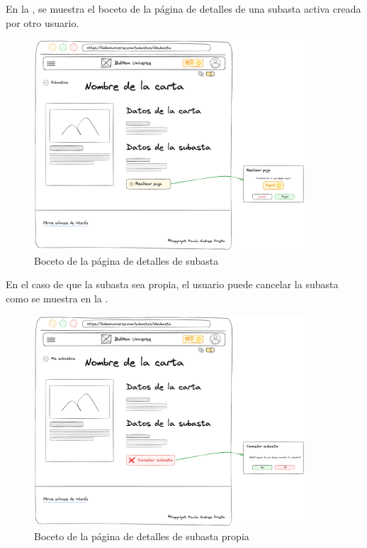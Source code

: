 En la ,
se muestra el boceto de la página de detalles de una subasta activa creada por otro usuario.
\begin{figure}[H]
    \centering
    \includegraphics[width=0.9\textwidth]{figures/6-Analisis/6-Interfaz/prototipos/detalle-subasta.png}
    \caption{Boceto de la página de detalles de subasta}
    \label{fig:p_auction_details}
    \hypertarget{fig:p_auction_details}{}
\end{figure}

En el caso de que la subasta sea propia, el usuario puede cancelar la subasta como se muestra en la .
\begin{figure}[H]
    \centering
    \includegraphics[width=0.9\textwidth]{figures/6-Analisis/6-Interfaz/prototipos/detalle-subasta-propia.png}
    \caption{Boceto de la página de detalles de subasta propia}
    \label{fig:p_auction_details_own}
    \hypertarget{fig:p_auction_details_own}{}
\end{figure}

